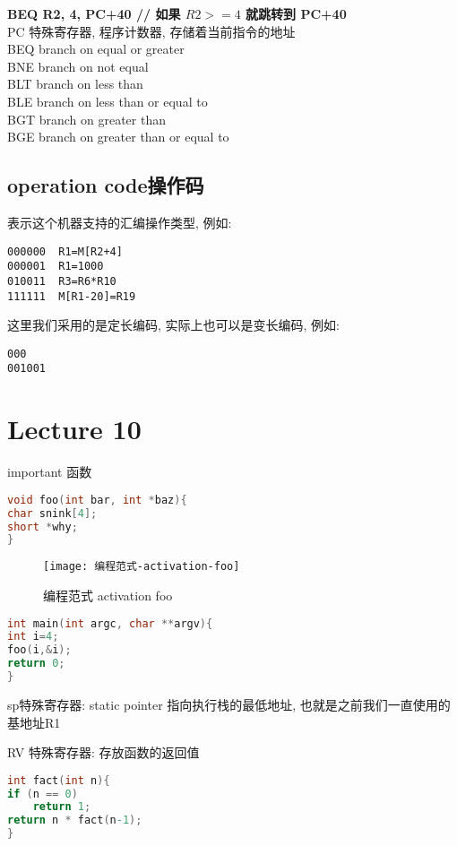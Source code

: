 \documentclass{article}
\begin{document}
\bigskip\noindent
\textbf{BEQ R2, 4,  PC+40  // 如果 $R2 >=4$ 就跳转到 PC+40}\\
PC 特殊寄存器, 程序计数器, 存储着当前指令的地址\\
BEQ  branch on equal or greater\\
BNE branch on not equal\\
BLT branch on less than\\
BLE branch on less than or equal to\\
BGT branch on greater than\\
BGE branch on greater than or equal to\\

\subsection{operation code操作码}
表示这个机器支持的汇编操作类型,
例如:
\begin{verbatim}
000000	R1=M[R2+4]
000001	R1=1000
010011	R3=R6*R10
111111	M[R1-20]=R19
\end{verbatim}
这里我们采用的是定长编码,
实际上也可以是变长编码,
例如:
\begin{verbatim}
000
001001
\end{verbatim}

\section{Lecture 10} important
函数
\begin{lstlisting}[language = C]
void foo(int bar, int *baz){
char snink[4];
short *why;
}
\end{lstlisting}
\begin{figure}[htbp]
	\centering
	\texttt{[image: 编程范式-activation-foo]}\\
	\caption{编程范式 activation foo}\label{fig.编程范式.activation.foo}
\end{figure}


\begin{lstlisting}[language = C]
int main(int argc, char **argv){
int i=4;
foo(i,&i);
return 0;
}
\end{lstlisting}

sp特殊寄存器:
static pointer 指向执行栈的最低地址, 也就是之前我们一直使用的基地址R1

RV 特殊寄存器:
存放函数的返回值

\begin{lstlisting}[language = C]
int fact(int n){
if (n == 0)
	return 1;
return n * fact(n-1);
}
\end{lstlisting}
\end{document}
